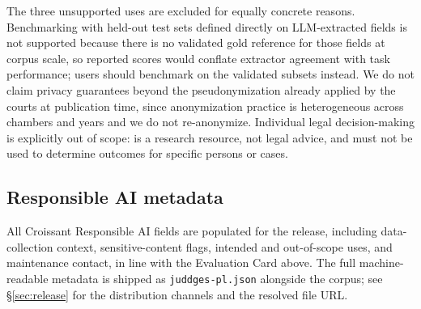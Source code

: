 The three unsupported uses are excluded for equally concrete reasons. Benchmarking with held-out test sets defined directly on LLM-extracted fields is not supported because there is no validated gold reference for those fields at corpus scale, so reported scores would conflate extractor agreement with task performance; users should benchmark on the validated subsets instead. We do not claim privacy guarantees beyond the pseudonymization already applied by the courts at publication time, since anonymization practice is heterogeneous across chambers and years and we do not re-anonymize. Individual legal decision-making is explicitly out of scope: \juddgespl{} is a research resource, not legal advice, and must not be used to determine outcomes for specific persons or cases.

\subsection{Responsible AI metadata}
\label{sec:datasheet:rai}

All Croissant Responsible AI fields are populated for the release, including data-collection context, sensitive-content flags, intended and out-of-scope uses, and maintenance contact, in line with the Evaluation Card above. The full machine-readable metadata is shipped as \texttt{juddges-pl.json} alongside the corpus; see \S\ref{sec:release} for the distribution channels and the resolved file URL.
